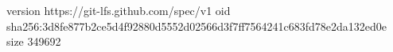 version https://git-lfs.github.com/spec/v1
oid sha256:3d8fe877b2ce5d4f92880d5552d02566d3f7ff7564241c683fd78e2da132ed0e
size 349692
